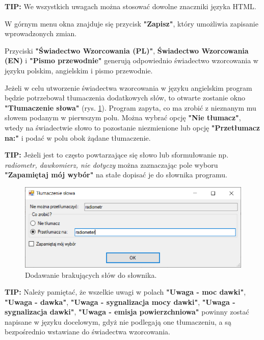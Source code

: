 	\textbf{TIP:} We wszystkich uwagach można stosować dowolne znaczniki języka HTML.

	W górnym menu okna znajduje się przycisk \textbf{"Zapisz"}, który umożliwia zapisanie wprowadzonych zmian.
	
	Przyciski \textbf{"Świadectwo Wzorcowania (PL)"}, \textbf{Świadectwo Wzorcowania (EN)} i \textbf{"Pismo przewodnie"} generują odpowiednio świadectwo wzorcowania w języku polskim, angielskim i pismo przewodnie.
	
	Jeżeli w celu utworzenie świadectwa wzorcowania w języku angielskim program będzie potrzebował tłumaczenia dodatkowych słów, to otwarte zostanie okno \textbf{"Tłumaczenie słowa"} (rys. \ref{tlumaczenie}).
	Program zapyta, co ma zrobić z nieznanym mu słowem podanym w pierwszym polu. Można wybrać opcję \textbf{"Nie tłumacz"}, wtedy na świadectwie słowo to pozostanie niezmienione lub opcję \textbf{"Przetłumacz na:"} i podać w polu obok żądane tłumaczenie. 
	
	\textbf{TIP:} Jeżeli jest to często powtarzające się słowo lub sformułowanie  np. \textit{radiometr, dawkomierz, nie dotyczy} można zaznaczając pole wyboru \textbf{"Zapamiętaj mój wybór"} na stałe dopisać je do słownika programu.

		
	\begin{figure}[htb]
		\centering
		\includegraphics[width=\columnwidth]{obrazki/Wzorcowanie/tlumaczenie.png}
		\caption{Dodawanie brakujących słów do słownika.}
		\label{tlumaczenie}
	\end{figure}

	\textbf{TIP:} Należy pamiętać, że wszelkie uwagi w polach \textbf{"Uwaga - moc dawki"}, \textbf{"Uwaga - dawka"}, \textbf{"Uwaga - sygnalizacja mocy dawki"}, \textbf{"Uwaga - sygnalizacja dawki"}, \textbf{"Uwaga - emisja powierzchniowa"} powinny zostać napisane w języku docelowym, gdyż nie podlegają one tłumaczeniu, a są bezpośrednio wstawiane do świadectwa wzorcowania.